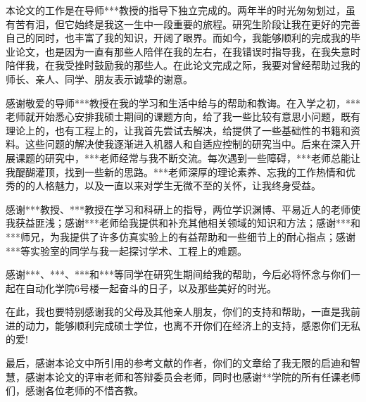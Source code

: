 
\begin{thanks}

本论文的工作是在导师***教授的指导下独立完成的。两年半的时光匆匆划过，虽有苦有泪，但它始终是我这一生中一段重要的旅程。研究生阶段让我在更好的完善自己的同时，也丰富了我的知识，开阔了眼界。而如今，我能够顺利的完成我的毕业论文，也是因为一直有那些人陪伴在我的左右，在我错误时指导我，在我失意时陪伴我，在我受挫时鼓励我的那些人。在此论文完成之际，我要对曾经帮助过我的师长、亲人、同学、朋友表示诚挚的谢意。

感谢敬爱的导师***教授在我的学习和生活中给与的帮助和教诲。在入学之初，***老师就开始悉心安排我硕士期间的课题方向，给了我一些比较有意思小问题，既有理论上的，也有工程上的，让我首先尝试去解决，给提供了一些基础性的书籍和资料。这些问题的解决使我逐渐进入机器人和自适应控制的研究当中。后来在深入开展课题的研究中，***老师经常与我不断交流。每次遇到一些障碍，***老师总能让我醍醐灌顶，找到一些新的思路。***老师深厚的理论素养、忘我的工作热情和优秀的的人格魅力，以及一直以来对学生无微不至的关怀，让我终身受益。

感谢***教授、***教授在学习和科研上的指导，两位学识渊博、平易近人的老师使我获益匪浅；感谢***老师给我提供和补充其他相关领域的知识和方法；感谢***和***师兄，为我提供了许多仿真实验上的有益帮助和一些细节上的耐心指点；感谢***等实验室的同学与我一起探讨学术、工程上的难题。

感谢***、***、***和***等同学在研究生期间给我的帮助，今后必将怀念与你们一起在自动化学院6号楼一起奋斗的日子，以及那些美好的时光。

在此，我也要特别感谢我的父母及其他亲人朋友，你们的支持和帮助，一直是我前进的动力，能够顺利完成硕士学位，也离不开你们在经济上的支持，感恩你们无私的爱!

最后，感谢本论文中所引用的参考文献的作者，你们的文章给了我无限的启迪和智慧，感谢本论文的评审老师和答辩委员会老师，同时也感谢**学院的所有任课老师们，感谢各位老师的不惜吝教。

\end{thanks}
